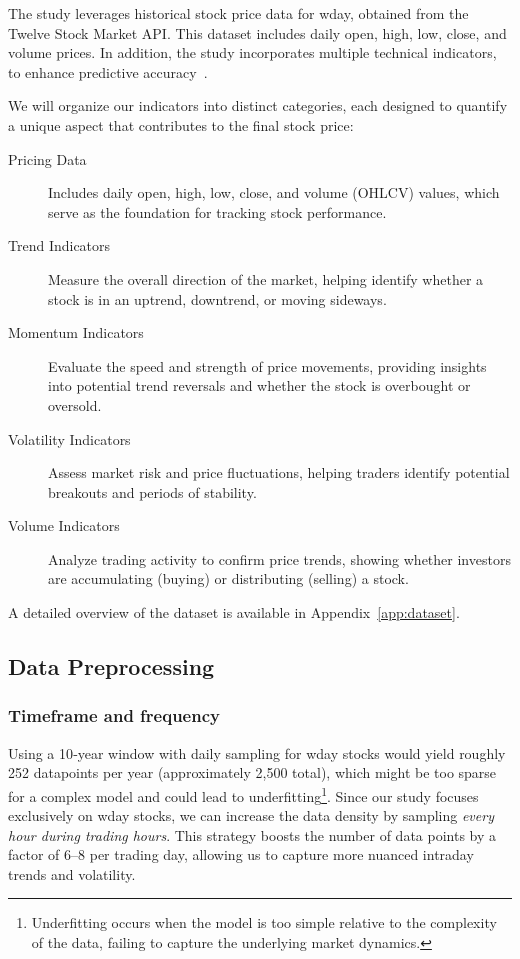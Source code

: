 The study leverages historical stock price data for \acrshort{wday}, obtained from the
Twelve Stock Market API. This dataset includes daily open, high, low, close, and volume prices. In
addition, the study incorporates multiple technical indicators, to
enhance predictive accuracy~\parencite{parmar2018stock, nabipour2020DeepLearning,
guo2024LSTMStock}. 

We will organize our indicators into distinct categories, each designed to quantify a unique aspect that contributes to the final stock price:

\begin{description}
    \item[Pricing Data] Includes daily open, high, low, close, and volume (OHLCV) values,
    which serve as the foundation for tracking stock performance.
    \item[Trend Indicators] Measure the overall direction of the market, helping identify 
    whether a stock is in an uptrend, downtrend, or moving sideways.
    \item[Momentum Indicators] Evaluate the speed and strength of price movements, providing
    insights into potential trend reversals and whether the stock is overbought or oversold.
    \item[Volatility Indicators] Assess market risk and price fluctuations, helping traders 
    identify potential breakouts and periods of stability.
    \item[Volume Indicators] Analyze trading activity to confirm price trends, showing
    whether investors are accumulating (buying) or distributing (selling) a stock.
\end{description}

A detailed overview of the dataset is available in Appendix~\ref{app:dataset}.

\subsection{Data Preprocessing}

\subsubsection{Timeframe and frequency}

Using a 10‐year window with daily sampling for \acrshort{wday} stocks would yield roughly 
252 datapoints per year (approximately 2,500 total), which might be too sparse for a complex model 
and could lead to underfitting\footnote{Underfitting occurs when the model is too simple relative to the complexity of the data, failing to capture the underlying market dynamics.}. Since our study focuses
exclusively on \acrshort{wday} stocks, we can increase the data density by sampling \emph{every hour 
during trading hours}. This strategy boosts the number of data points by a factor of 6–8 per trading
day, allowing us to capture more nuanced intraday trends and volatility.

